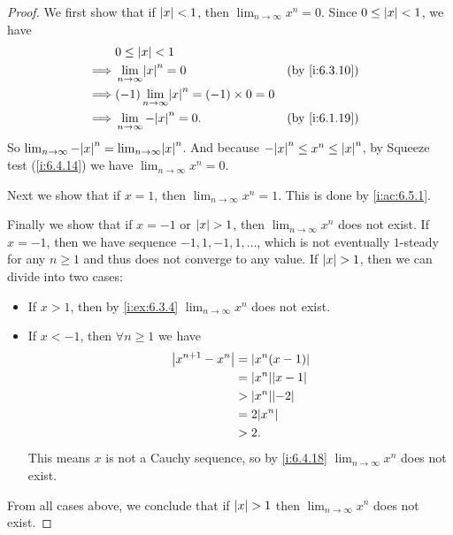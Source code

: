 \begin{proof}
  We first show that if \(\left\lvert x\right\rvert < 1\), then \(\lim_{n \to \infty} x^n = 0\).
  Since \(0 \leq \left\lvert x\right\rvert < 1\), we have
  \begin{align*}
             & 0 \leq \abs{x} < 1                                                       \\
    \implies & \lim_{n \to \infty} \abs{x}^n = 0                     &  & \by{i:6.3.10} \\
    \implies & (-1)\lim_{n \to \infty} \abs{x}^n = (-1) \times 0 = 0                    \\
    \implies & \lim_{n \to \infty} -\abs{x}^n = 0.                   &  & \by{i:6.1.19}
  \end{align*}
  So \(\lim_{n \to \infty} -\abs{x}^n = \lim_{n \to \infty} \abs{x}^n\).
  And because \(-\abs{x}^n \leq x^n \leq \abs{x}^n\), by Squeeze test (\cref{i:6.4.14}) we have \(\lim_{n \to \infty} x^n = 0\).

  Next we show that if \(x = 1\), then \(\lim_{n \to \infty} x^n = 1\).
  This is done by \cref{i:ac:6.5.1}.

  Finally we show that if \(x = -1\) or \(\left\lvert x\right\rvert > 1\), then \(\lim_{n \to \infty} x^n\) does not exist.
  If \(x = -1\), then we have sequence \(-1, 1, -1, 1, \dots\), which is not eventually \(1\)-steady for any \(n \geq 1\) and thus does not converge to any value.
  If \(\left\lvert x\right\rvert > 1\), then we can divide into two cases:
  \begin{itemize}
    \item If \(x > 1\), then by \cref{i:ex:6.3.4} \(\lim_{n \to \infty} x^n\) does not exist.
    \item If \(x < -1\), then \(\forall n \geq 1\) we have
          \begin{align*}
            \abs{x^{n + 1} - x^n} & = \abs{x^n(x - 1)}     \\
                                  & = \abs{x^n}\abs{x - 1} \\
                                  & > \abs{x^n}\abs{-2}    \\
                                  & = 2\abs{x^n}           \\
                                  & > 2.
          \end{align*}
          This means \(x\) is not a Cauchy sequence, so by \cref{i:6.4.18} \(\lim_{n \to \infty} x^n\) does not exist.
  \end{itemize}
  From all cases above, we conclude that if \(\left\lvert x\right\rvert > 1\) then \(\lim_{n \to \infty} x^n\) does not exist.
\end{proof}

